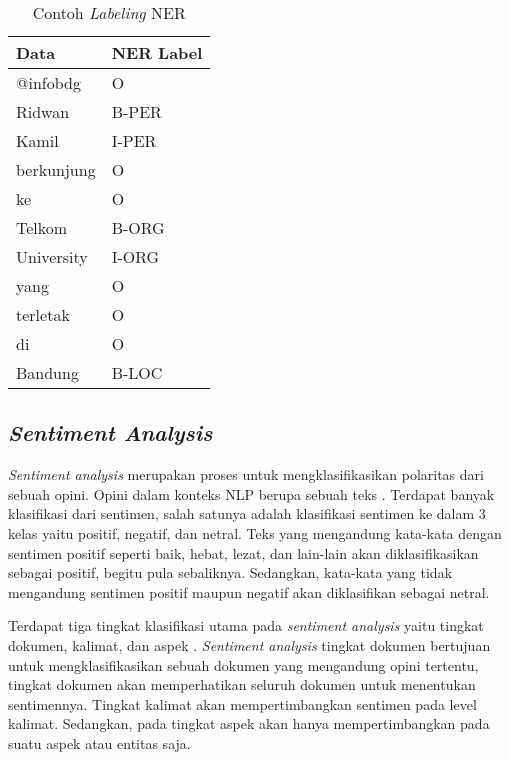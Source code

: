 \begin{table}[h]
    \vspace{0.25cm}
    \caption{Contoh \textit{Labeling} NER \parencite{ner}}
    \label{table:contoh-labeling-ner}
    \begin{center}
        \begin{tabular}{ll}
            \hline
            \textbf{Data} & \textbf{NER Label} \\ \hline
            @infobdg & O \\ \hline
            Ridwan & B-PER \\ \hline
            Kamil & I-PER \\ \hline
            berkunjung & O \\ \hline
            ke & O \\ \hline
            Telkom & B-ORG \\ \hline
            University & I-ORG \\ \hline
            yang & O \\ \hline
            terletak & O \\ \hline
            di & O \\ \hline
            Bandung & B-LOC \\ \hline
        \end{tabular}
    \end{center}
\end{table}

\subsection{\textit{Sentiment Analysis}}

\textit{Sentiment analysis} merupakan proses untuk mengklasifikasikan polaritas dari sebuah opini. Opini dalam konteks NLP berupa sebuah teks \parencite{sentiment_stock}. Terdapat banyak klasifikasi dari sentimen, salah satunya adalah klasifikasi sentimen ke dalam 3 kelas yaitu positif, negatif, dan netral. Teks yang mengandung kata-kata dengan sentimen positif seperti baik, hebat, lezat, dan lain-lain akan diklasifikasikan sebagai positif, begitu pula sebaliknya. Sedangkan, kata-kata yang tidak mengandung sentimen positif maupun negatif akan diklasifikan sebagai netral.

Terdapat tiga tingkat klasifikasi utama pada \textit{sentiment analysis} yaitu tingkat dokumen, kalimat, dan aspek \parencite{sentiment_algo}. \textit{Sentiment analysis} tingkat dokumen bertujuan untuk mengklasifikasikan sebuah dokumen yang mengandung opini tertentu, tingkat dokumen akan memperhatikan seluruh dokumen untuk menentukan sentimennya. Tingkat kalimat akan mempertimbangkan sentimen pada level kalimat. Sedangkan, pada tingkat aspek akan hanya mempertimbangkan pada suatu aspek atau entitas saja.

